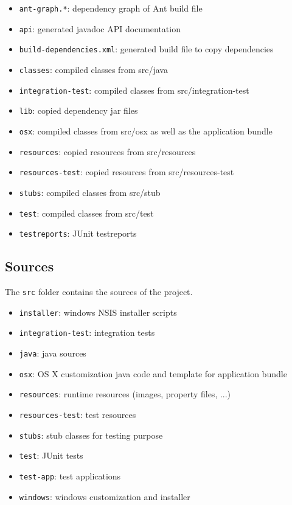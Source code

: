 \documentclass[11pt,a4paper]{article}
\begin{document}
\begin{itemize}
 \item \texttt{ant-graph.*}: dependency graph of Ant build file
 \item \texttt{api}: generated javadoc API documentation
 \item \texttt{build-dependencies.xml}: generated build file to copy dependencies
 \item \texttt{classes}: compiled classes from src/java
 \item \texttt{integration-test}: compiled classes from src/integration-test
 \item \texttt{lib}: copied dependency jar files
 \item \texttt{osx}: compiled classes from src/osx as well as the application bundle
 \item \texttt{resources}: copied resources from src/resources
 \item \texttt{resources-test}: copied resources from src/resources-test
 \item \texttt{stubs}: compiled classes from src/stub
 \item \texttt{test}: compiled classes from src/test
 \item \texttt{testreports}: JUnit testreports
\end{itemize}


\subsection{Sources}
The \texttt{src} folder contains the sources of the project.

\begin{itemize}
 \item \texttt{installer}: windows NSIS installer scripts
 \item \texttt{integration-test}: integration tests
 \item \texttt{java}: java sources
 \item \texttt{osx}: OS X customization java code and template for application bundle
 \item \texttt{resources}: runtime resources (images, property files, ...)
 \item \texttt{resources-test}: test resources
 \item \texttt{stubs}: stub classes for testing purpose
 \item \texttt{test}: JUnit tests
 \item \texttt{test-app}: test applications
 \item \texttt{windows}: windows customization and installer
\end{itemize}
\end{document}
